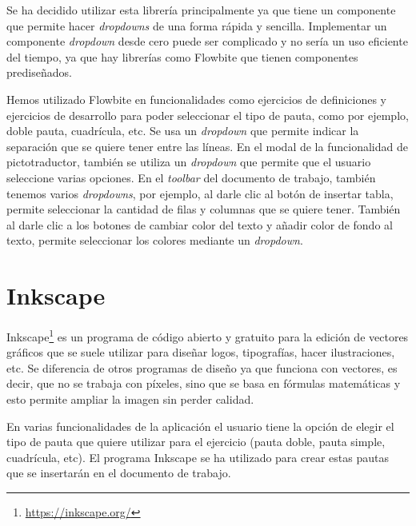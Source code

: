 Se ha decidido utilizar esta librería principalmente ya que tiene un componente que permite hacer \textit{dropdowns} de una forma rápida y sencilla. Implementar un componente \textit{dropdown} desde cero puede ser complicado y no sería un uso eficiente del tiempo, ya que hay librerías como Flowbite que tienen componentes prediseñados.

Hemos utilizado Flowbite en funcionalidades como ejercicios de definiciones y ejercicios de desarrollo para poder seleccionar el tipo de pauta, como por ejemplo, doble pauta, cuadrícula, etc. Se usa un \textit{dropdown} que permite indicar la separación que se quiere tener entre las líneas. En el modal de la funcionalidad de pictotraductor, también se utiliza un \textit{dropdown} que permite que el usuario seleccione varias opciones. En el \textit{toolbar} del documento de trabajo, también tenemos varios \textit{dropdowns}, por ejemplo, al darle clic al botón de insertar tabla, permite seleccionar la cantidad de filas y columnas que se quiere tener. También al darle clic a los botones de cambiar color del texto y añadir color de fondo al texto, permite seleccionar los colores mediante un \textit{dropdown}.

\section{Inkscape}\label{sec:inkscape}
Inkscape\footnote{\url{https://inkscape.org/}} es un programa de código abierto y gratuito para la edición de vectores gráficos que se suele utilizar para diseñar logos, tipografías, hacer ilustraciones, etc. Se diferencia de otros programas de diseño ya que funciona con vectores, es decir, que no se trabaja con píxeles, sino que se basa en fórmulas matemáticas y esto permite ampliar la imagen sin perder calidad.

En varias funcionalidades de la aplicación el usuario tiene la opción de elegir el tipo de pauta que quiere utilizar para el ejercicio (pauta doble, pauta simple, cuadrícula, etc). El programa Inkscape se ha utilizado para crear estas pautas que se insertarán en el documento de trabajo.


